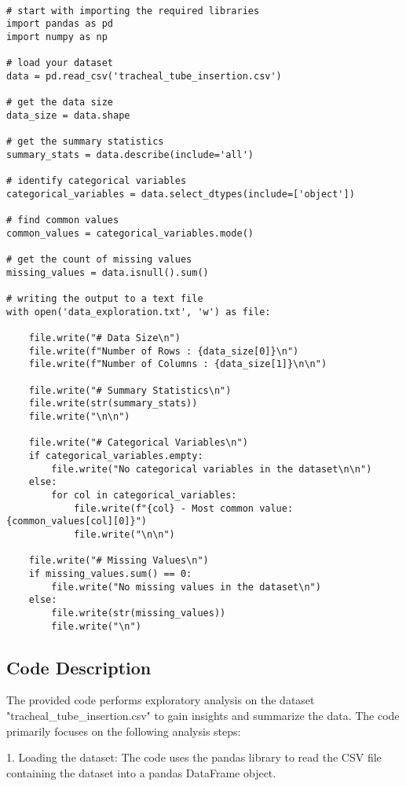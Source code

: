 \documentclass[11pt]{article}
\begin{document}
\begin{verbatim}

# start with importing the required libraries
import pandas as pd
import numpy as np

# load your dataset
data = pd.read_csv('tracheal_tube_insertion.csv')

# get the data size
data_size = data.shape

# get the summary statistics
summary_stats = data.describe(include='all')

# identify categorical variables 
categorical_variables = data.select_dtypes(include=['object'])

# find common values
common_values = categorical_variables.mode()

# get the count of missing values 
missing_values = data.isnull().sum()

# writing the output to a text file
with open('data_exploration.txt', 'w') as file:
    
    file.write("# Data Size\n")
    file.write(f"Number of Rows : {data_size[0]}\n")
    file.write(f"Number of Columns : {data_size[1]}\n\n")
    
    file.write("# Summary Statistics\n")
    file.write(str(summary_stats))
    file.write("\n\n")
    
    file.write("# Categorical Variables\n")
    if categorical_variables.empty:
        file.write("No categorical variables in the dataset\n\n")
    else:
        for col in categorical_variables:
            file.write(f"{col} - Most common value: {common_values[col][0]}")
            file.write("\n\n")
    
    file.write("# Missing Values\n")
    if missing_values.sum() == 0:
        file.write("No missing values in the dataset\n")
    else:
        file.write(str(missing_values))
        file.write("\n")

\end{verbatim}

\subsection{Code Description}

The provided code performs exploratory analysis on the dataset "tracheal\_tube\_insertion.csv" to gain insights and summarize the data. The code primarily focuses on the following analysis steps:

1. Loading the dataset: The code uses the pandas library to read the CSV file containing the dataset into a pandas DataFrame object.
\end{document}
